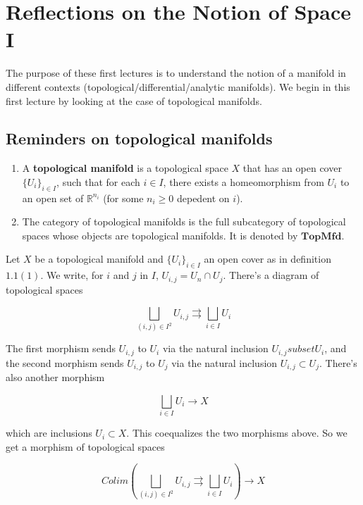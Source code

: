 \documentclass[../main.tex]{subfiles}
\begin{document}
\setcounter{chapter}{0}
\chapter{Reflections on the Notion of Space I}

The purpose of these first lectures is to understand the notion of a manifold in different contexts (topological/differential/analytic manifolds). We begin in this first lecture by looking at the case of topological manifolds.

\section{Reminders on topological manifolds}

\begin{defn}


\begin{enumerate}
    \item A \textbf{topological manifold} is a topological space $X$ that has an open cover $\{U_i\}_{i \in I}$, such that for each $i \in I$, there exists a homeomorphism from $U_i$ to an open set of $\mathbb R^{n_i}$ (for some $n_i\ge 0$ depedent on $i$).
    \item The category of topological manifolds is the full subcategory of topological spaces whose objects are topological manifolds. It is denoted by $\mathbf{TopMfd}$.
\end{enumerate}

\end{defn}

Let $X$ be a topological manifold and $\{U_i\}_{i \in I}$ an open cover as in definition $1.1 (1)$. We write, for $i$ and $j$ in $I$, $U_{i,j} = U_n \cap U_j$. There's a diagram of topological spaces

\[
    \bigsqcup_{(i, j) \in I^2} U_{i, j} \rightrightarrows \bigsqcup_{i \in I} U_i
\]

The first morphism sends $U_{i, j}$ to $U_i$ via the natural inclusion $U_{i,j}
subset U_i$, and the second morphism sends $U_{i, j}$ to $U_j$ via the natural inclusion $U_{i, j}
\subset U_j$. There's also another morphism

\[
    \bigsqcup_{i \in I} U_i \to X
\]

which are inclusions $U_i \subset X$. This coequalizes the two morphisms above. So we get a morphism of topological spaces

\[
Colim\left(\bigsqcup_{(i, j) \in I^2} U_{i, j} \rightrightarrows \bigsqcup_{i \in I} U_i\right) \to X
\]
\end{document}
